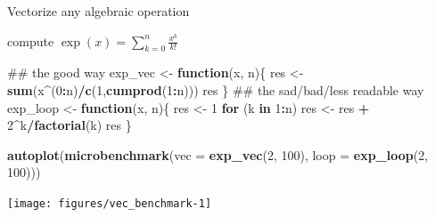 \documentclass[10pt,ignorenonframetext,]{beamer}
\newenvironment{Shaded}{\begin{snugshade}}{\end{snugshade}}
\newcommand{\KeywordTok}[1]{\textcolor[rgb]{0.13,0.29,0.53}{\textbf{#1}}}
\newcommand{\DataTypeTok}[1]{\textcolor[rgb]{0.13,0.29,0.53}{#1}}
\newcommand{\DecValTok}[1]{\textcolor[rgb]{0.00,0.00,0.81}{#1}}
\newcommand{\StringTok}[1]{\textcolor[rgb]{0.31,0.60,0.02}{#1}}
\newcommand{\ControlFlowTok}[1]{\textcolor[rgb]{0.13,0.29,0.53}{\textbf{#1}}}
\newcommand{\OperatorTok}[1]{\textcolor[rgb]{0.81,0.36,0.00}{\textbf{#1}}}
\newcommand{\NormalTok}[1]{#1}
\begin{document}
\begin{frame}{Vectorize any algebraic
operation}

 compute \(\exp(x) = \sum_{k=0}^{n} \frac{x^k}{k!}\)

\scriptsize

\begin{Shaded}
\begin{Highlighting}[]
\NormalTok{## the good way}
\NormalTok{exp_vec <-}\StringTok{ }\ControlFlowTok{function}\NormalTok{(x, n)\{}
\NormalTok{  res <-}\StringTok{ }\KeywordTok{sum}\NormalTok{(x}\OperatorTok{^}\NormalTok{(}\DecValTok{0}\OperatorTok{:}\NormalTok{n)}\OperatorTok{/}\KeywordTok{c}\NormalTok{(}\DecValTok{1}\NormalTok{,}\KeywordTok{cumprod}\NormalTok{(}\DecValTok{1}\OperatorTok{:}\NormalTok{n)))}
\NormalTok{  res}
\NormalTok{\}}
\NormalTok{## the sad/bad/less readable way}
\NormalTok{exp_loop <-}\StringTok{ }\ControlFlowTok{function}\NormalTok{(x, n)\{}
\NormalTok{  res <-}\StringTok{ }\DecValTok{1}
  \ControlFlowTok{for}\NormalTok{ (k }\ControlFlowTok{in} \DecValTok{1}\OperatorTok{:}\NormalTok{n) res <-}\StringTok{ }\NormalTok{res }\OperatorTok{+}\StringTok{ }\DecValTok{2}\OperatorTok{^}\NormalTok{k}\OperatorTok{/}\KeywordTok{factorial}\NormalTok{(k)}
\NormalTok{  res}
\NormalTok{\}}
\end{Highlighting}
\end{Shaded}

\normalsize

\scriptsize

\begin{Shaded}
\begin{Highlighting}[]
\KeywordTok{autoplot}\NormalTok{(}\KeywordTok{microbenchmark}\NormalTok{(}\DataTypeTok{vec =} \KeywordTok{exp_vec}\NormalTok{(}\DecValTok{2}\NormalTok{, }\DecValTok{100}\NormalTok{), }\DataTypeTok{loop =} \KeywordTok{exp_loop}\NormalTok{(}\DecValTok{2}\NormalTok{, }\DecValTok{100}\NormalTok{)))}
\end{Highlighting}
\end{Shaded}

\begin{center}\texttt{[image: figures/vec\_benchmark-1]} \end{center}

\normalsize

\end{frame}
\end{document}
